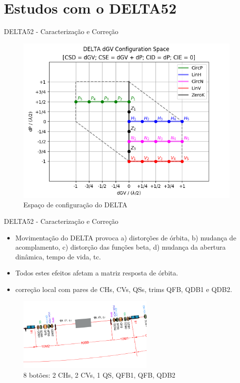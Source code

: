 \documentclass{beamer}					  %
\begin{document}
\section{Estudos com o DELTA52}

\begin{frame}{DELTA52 - Caracterização e Correção}
    \begin{figure}[H]
    		\centering
            \includegraphics[width=.8\textwidth]{2024-01-26/figures/id-delta-dgv-config-space.png}
            \caption{Espaço de configuração do DELTA}
            \label{fig:delta-config-space}
    \end{figure}
\end{frame}

\begin{frame}{DELTA52 - Caracterização e Correção}
    \begin{itemize}
    		\item Movimentação do DELTA provoca a) distorções de órbita, b) mudança de acomplamento, c) distorção das funções beta, d) mudança da abertura dinâmica, tempo de vida, tc.
            \item Todos estes efeitos afetam a matriz resposta de órbita.
            \item correção local com pares de CHs, CVs, QSs, trims QFB, QDB1 e QDB2.
    \end{itemize}
    \begin{figure}[H]
        	\centering
            \includegraphics[width=0.6\textwidth]{2024-01-26/figures/si-10sb-2.png}
            \caption{\small{8 botões: 2 CHs, 2 CVs, 1 QS, QFB1, QFB, QDB2}}
            \label{fig:bba}
    \end{figure}
\end{frame}
\end{document}
